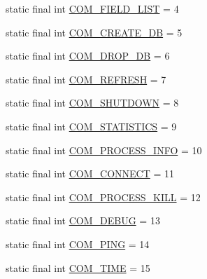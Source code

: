 \begin{DoxyCompactItemize}
\item 
static final int \mbox{\hyperlink{classcom_1_1mysql_1_1cj_1_1protocol_1_1a_1_1_native_constants_a589b0d8f92d36061e33c3ee30faef1d6}{C\+O\+M\+\_\+\+F\+I\+E\+L\+D\+\_\+\+L\+I\+ST}} = 4
\item 
static final int \mbox{\hyperlink{classcom_1_1mysql_1_1cj_1_1protocol_1_1a_1_1_native_constants_ad936a18bead0a5439b680f1158657710}{C\+O\+M\+\_\+\+C\+R\+E\+A\+T\+E\+\_\+\+DB}} = 5
\item 
static final int \mbox{\hyperlink{classcom_1_1mysql_1_1cj_1_1protocol_1_1a_1_1_native_constants_a0c769bb312505a6aaac5a5e16d080518}{C\+O\+M\+\_\+\+D\+R\+O\+P\+\_\+\+DB}} = 6
\item 
static final int \mbox{\hyperlink{classcom_1_1mysql_1_1cj_1_1protocol_1_1a_1_1_native_constants_a26198056ad9ee7b612e67fd8fadd9744}{C\+O\+M\+\_\+\+R\+E\+F\+R\+E\+SH}} = 7
\item 
static final int \mbox{\hyperlink{classcom_1_1mysql_1_1cj_1_1protocol_1_1a_1_1_native_constants_a7f0325583609427184ff9b4a409a4f60}{C\+O\+M\+\_\+\+S\+H\+U\+T\+D\+O\+WN}} = 8
\item 
static final int \mbox{\hyperlink{classcom_1_1mysql_1_1cj_1_1protocol_1_1a_1_1_native_constants_a8ed378244d2cb10e0910d04d2a41e07b}{C\+O\+M\+\_\+\+S\+T\+A\+T\+I\+S\+T\+I\+CS}} = 9
\item 
static final int \mbox{\hyperlink{classcom_1_1mysql_1_1cj_1_1protocol_1_1a_1_1_native_constants_a7c2d7bfdbf7d2b09972716bfcdfadb14}{C\+O\+M\+\_\+\+P\+R\+O\+C\+E\+S\+S\+\_\+\+I\+N\+FO}} = 10
\item 
static final int \mbox{\hyperlink{classcom_1_1mysql_1_1cj_1_1protocol_1_1a_1_1_native_constants_a4bfc53c39d162df3bc22655f6c4c7166}{C\+O\+M\+\_\+\+C\+O\+N\+N\+E\+CT}} = 11
\item 
static final int \mbox{\hyperlink{classcom_1_1mysql_1_1cj_1_1protocol_1_1a_1_1_native_constants_a1ee9110d23134c118a0caabd05c689ee}{C\+O\+M\+\_\+\+P\+R\+O\+C\+E\+S\+S\+\_\+\+K\+I\+LL}} = 12
\item 
static final int \mbox{\hyperlink{classcom_1_1mysql_1_1cj_1_1protocol_1_1a_1_1_native_constants_aaa4dcf15606c3b951faa488162442524}{C\+O\+M\+\_\+\+D\+E\+B\+UG}} = 13
\item 
static final int \mbox{\hyperlink{classcom_1_1mysql_1_1cj_1_1protocol_1_1a_1_1_native_constants_a3b0d142b162e94c1f2e4b8394c137261}{C\+O\+M\+\_\+\+P\+I\+NG}} = 14
\item 
static final int \mbox{\hyperlink{classcom_1_1mysql_1_1cj_1_1protocol_1_1a_1_1_native_constants_a039a6692c30a1894b2016a436e78534e}{C\+O\+M\+\_\+\+T\+I\+ME}} = 15

\end{DoxyCompactItemize}
